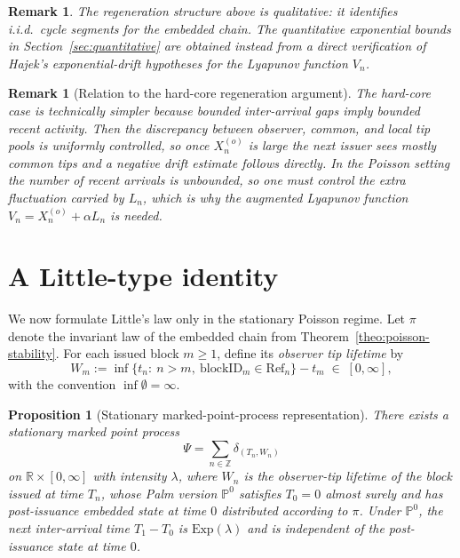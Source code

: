 \documentclass[a4paper,12pt,oneside,reqno]{amsart}
\newcommand{\blockID}{\mathrm{blockID}}
\renewcommand{\P}{{\mathbb P}}
\newcommand{\1}{{\mathbf 1}}
\newcommand{\refBlock}{\mathrm{Ref}}
\newtheorem{prop}[theo]{Proposition}
\newtheorem{rem}[theo]{Remark}
\begin{document}
\begin{rem}
The regeneration structure above is qualitative: it identifies i.i.d.\ cycle segments for the embedded chain. The quantitative exponential bounds in Section~\ref{sec:quantitative} are obtained instead from a direct verification of Hajek's exponential-drift hypotheses for the Lyapunov function $V_n$.
\end{rem}

\begin{rem}[Relation to the hard-core regeneration argument]
The hard-core case is technically simpler because bounded inter-arrival gaps imply bounded recent activity. Then the discrepancy between observer, common, and local tip pools is uniformly controlled, so once $X_n^{(o)}$ is large the next issuer sees mostly common tips and a negative drift estimate follows directly. In the Poisson setting the number of recent arrivals is unbounded, so one must control the extra fluctuation carried by $L_n$, which is why the augmented Lyapunov function $V_n=X_n^{(o)}+\alpha L_n$ is needed.
\end{rem}

\section{A Little-type identity}\label{sec:little}
We now formulate Little's law only in the stationary Poisson regime. Let $\pi$ denote the invariant law of the embedded chain from Theorem~\ref{theo:poisson-stability}. For each issued block $m\ge1$, define its \emph{observer tip lifetime} by
\[
   W_m := \inf\{t_n:\ n>m,\ \blockID_m \in \refBlock_n\}-t_m \;\in\; [0,\infty],
\]
with the convention $\inf\emptyset=\infty$.

\begin{prop}[Stationary marked-point-process representation]\label{prop:little-palm}
There exists a stationary marked point process
\[
   \Psi=\sum_{n\in\mathbb Z}\delta_{(T_n,W_n)}
\]
on $\mathbb{R}\times [0,\infty]$ with intensity $\lambda$, where $W_n$ is the observer-tip lifetime of the block issued at time $T_n$, whose Palm version $\P^0$ satisfies $T_0=0$ almost surely and has post-issuance embedded state at time $0$ distributed according to $\pi$. Under $\P^0$, the next inter-arrival time $T_1-T_0$ is $\mathrm{Exp}(\lambda)$ and is independent of the post-issuance state at time $0$.
\end{prop}
\end{document}
